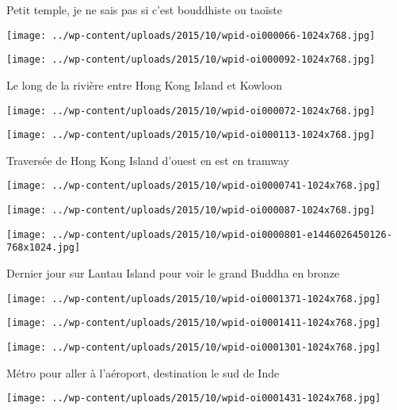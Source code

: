  Petit temple, je ne sais pas si c'est bouddhiste ou taoïste \newline
 \newline
\centerline{\texttt{[image: ../wp-content/uploads/2015/10/wpid-oi000066-1024x768.jpg]} } 
 \newline
 \newline
\centerline{\texttt{[image: ../wp-content/uploads/2015/10/wpid-oi000092-1024x768.jpg]} } 
 \newline
 Le long de la rivière entre Hong Kong Island et Kowloon \newline
 \newline
\centerline{\texttt{[image: ../wp-content/uploads/2015/10/wpid-oi000072-1024x768.jpg]} } 
 \newline
 \newline
\centerline{\texttt{[image: ../wp-content/uploads/2015/10/wpid-oi000113-1024x768.jpg]} } 
 \newline
 Traversée de Hong Kong Island d'ouest en est en tramway \newline
 \newline
\centerline{\texttt{[image: ../wp-content/uploads/2015/10/wpid-oi0000741-1024x768.jpg]} } 
 \newline
 \newline
\centerline{\texttt{[image: ../wp-content/uploads/2015/10/wpid-oi000087-1024x768.jpg]} } 
 \newline
 \newline
\centerline{\texttt{[image: ../wp-content/uploads/2015/10/wpid-oi0000801-e1446026450126-768x1024.jpg]} } 
 \newline
 Dernier jour sur Lantau Island pour voir le grand Buddha en bronze \newline
 \newline
\centerline{\texttt{[image: ../wp-content/uploads/2015/10/wpid-oi0001371-1024x768.jpg]} } 
 \newline
 \newline
\centerline{\texttt{[image: ../wp-content/uploads/2015/10/wpid-oi0001411-1024x768.jpg]} } 
 \newline
 \newline
\centerline{\texttt{[image: ../wp-content/uploads/2015/10/wpid-oi0001301-1024x768.jpg]} } 
 \newline
 Métro pour aller à l'aéroport, destination le sud de Inde \newline
 \newline
\centerline{\texttt{[image: ../wp-content/uploads/2015/10/wpid-oi0001431-1024x768.jpg]} } 
 \newline

\newpage
 
